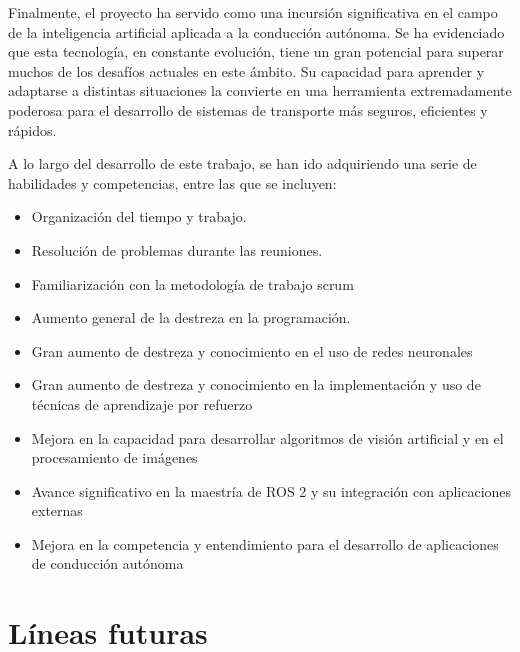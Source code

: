 \bigskip

Finalmente, el proyecto ha servido como una incursión significativa en el campo de la inteligencia artificial aplicada a la conducción autónoma. Se ha evidenciado que esta tecnología, en constante evolución, tiene un gran potencial para superar muchos de los desafíos actuales en este ámbito. Su capacidad para aprender y adaptarse a distintas situaciones  la convierte en una herramienta extremadamente poderosa para el desarrollo de sistemas de transporte más seguros, eficientes y rápidos.

\bigskip


A lo largo del desarrollo de este trabajo, se han ido adquiriendo una serie de habilidades y competencias, entre las que se incluyen:
\begin{itemize}
	\item Organización del tiempo y trabajo.
	\item Resolución de problemas durante las reuniones.
	\item Familiarización con la metodología de trabajo scrum 
	\item Aumento general de la destreza en la programación.
	\item Gran aumento de destreza y conocimiento en el uso de redes neuronales
	\item Gran aumento de destreza y conocimiento en la implementación y uso de técnicas de aprendizaje por refuerzo
	\item Mejora en la capacidad para desarrollar algoritmos de visión artificial y en el procesamiento de imágenes
	\item Avance significativo en la maestría de ROS 2 y su integración con aplicaciones externas
	\item Mejora en la competencia y entendimiento para el desarrollo de aplicaciones de conducción autónoma
\end{itemize}

\section{Líneas futuras}
\label{sec:lineas_futuras}

